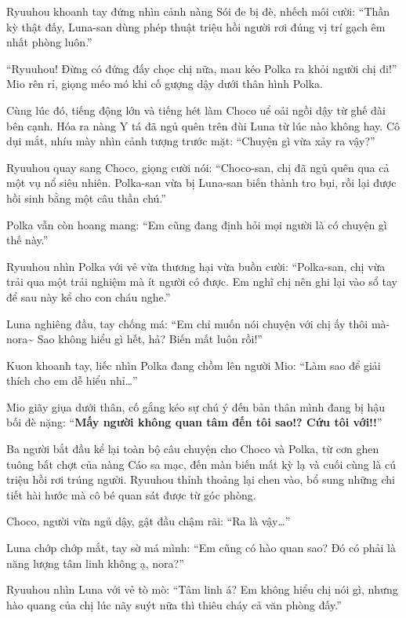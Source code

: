 \documentclass[../main.tex]{subfiles}
\begin{document}
Ryuuhou khoanh tay đứng nhìn cảnh nàng Sói đe bị đè, nhếch môi cười: ``Thần kỳ thật đấy, Luna-san dùng phép thuật triệu hồi người rơi đúng vị trí gạch êm nhất phòng luôn.''

``Ryuuhou! Đừng có đứng đấy chọc chị nữa, mau kéo Polka ra khỏi người chị đi!'' Mio rên rỉ, giọng méo mó khi cố gượng dậy dưới thân hình Polka.

Cùng lúc đó, tiếng động lớn và tiếng hét làm Choco uể oải ngồi dậy từ ghế dài bên cạnh. Hóa ra nàng Y tá đã ngủ quên trên đùi Luna từ lúc nào không hay. Cô dụi mắt, nhíu mày nhìn cảnh tượng trước mặt: ``Chuyện gì vừa xảy ra vậy?''

Ryuuhou quay sang Choco, giọng cười nói: ``Choco-san, chị đã ngủ quên qua cả một vụ nổ siêu nhiên. Polka-san vừa bị Luna-san biến thành tro bụi, rồi lại được hồi sinh bằng một câu thần chú.''

Polka vẫn còn hoang mang: ``Em cũng đang định hỏi mọi người là có chuyện gì thế này.''

Ryuuhou nhìn Polka với vẻ vừa thương hại vừa buồn cười: ``Polka-san, chị vừa trải qua một trải nghiệm mà ít người có được. Em nghĩ chị nên ghi lại vào sổ tay để sau này kể cho con cháu nghe.''

Luna nghiêng đầu, tay chống má: ``Em chỉ muốn nói chuyện với chị ấy thôi mà-nora\~{} Sao không hiểu gì hết, hả? Biến mất luôn rồi!''

Kuon khoanh tay, liếc nhìn Polka đang chồm lên người Mio: ``Làm sao để giải thích cho em dễ hiểu nhỉ\dots''

Mio giãy giụa dưới thân, cố gắng kéo sự chú ý đến bản thân mình đang bị hậu bối đè nặng: ``\textbf{Mấy người không quan tâm đến tôi sao!? Cứu tôi với!!}''

\ct

Ba người bắt đầu kể lại toàn bộ câu chuyện cho Choco và Polka, từ cơn ghen tuông bất chợt của nàng Cáo sa mạc, đến màn biến mất kỳ lạ và cuối cùng là cú triệu hồi rơi trúng người. Ryuuhou thỉnh thoảng lại chen vào, bổ sung những chi tiết hài hước mà cô bé quan sát được từ góc phòng.

Choco, người vừa ngủ dậy, gật đầu chậm rãi: ``Ra là vậy\dots''

Luna chớp chớp mắt, tay sờ má mình: ``Em cũng có hào quan sao? Đó có phải là năng lượng tâm linh không ạ, nora?''

Ryuuhou nhìn Luna với vẻ tò mò: ``Tâm linh á? Em không hiểu chị nói gì, nhưng hào quang của chị lúc nãy suýt nữa thì thiêu cháy cả văn phòng đấy.''
\end{document}
